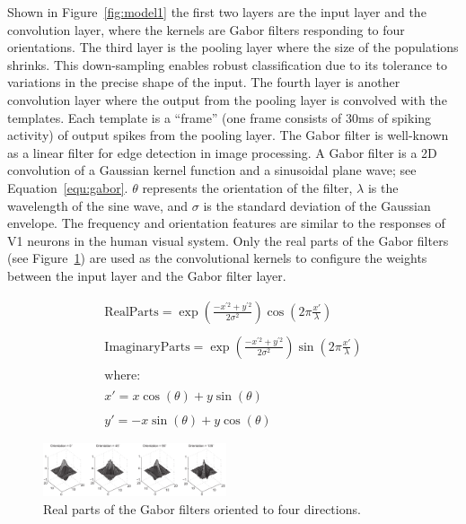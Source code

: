 \documentclass[journal]{journal}
\begin{document}
Shown in Figure~\ref{fig:model1} the first two layers are the input layer and the convolution layer, where the kernels are Gabor filters responding to four orientations. 
The third layer is the pooling layer where the size of the populations shrinks. 
This down-sampling enables robust classification due to its tolerance to variations in the precise shape of the input. 
The fourth layer is another convolution layer where the output from the pooling layer is convolved with the templates. 
Each template is a “frame” (one frame consists of 30ms of spiking activity) of output spikes from the pooling layer.
The Gabor filter is well-known as a linear filter for edge detection in image processing. 
A Gabor filter is a 2D convolution of a Gaussian kernel function and a sinusoidal plane wave; see Equation~\ref{equ:gabor}. 
$\theta$ represents the orientation of the filter, $\lambda$ is the wavelength of the sine wave, and $\sigma$ is the standard deviation of the Gaussian envelope. 
The frequency and orientation features are similar to the responses of V1 neurons in the human visual system. 
Only the real parts of the Gabor filters (see Figure~\ref{fig:gabor}) are used as the convolutional kernels to configure the weights between the input layer and the Gabor filter layer.

\begin{equation}
\begin{array}{l}
\mathrm{Real Parts} = \exp \left(\frac{-x^{'2}+y^{'2}}{2\sigma ^{2}}\right)\cos \left(2\pi\frac{{x}'}{\lambda }\right)
\\
\\
\mathrm{Imaginary Parts} = \exp \left(\frac{-x^{'2}+y^{'2}}{2\sigma ^{2}}\right)\sin \left(2\pi\frac{{x}'}{\lambda }\right)
\\
\\
\mathrm{where:}
\\
\\
{x}'=x\cos (\theta ) + y\sin (\theta)
\\
\\
{y}'=-x\sin (\theta ) + y\cos (\theta)
\end{array}
\label{equ:gabor}
\end{equation}


\begin{figure}
\centering
	\includegraphics[width=0.48\textwidth]{pics/gabor.pdf}
	\caption{Real parts of the Gabor filters oriented to four directions.}
	\label{fig:gabor}
\end{figure}
\end{document}
